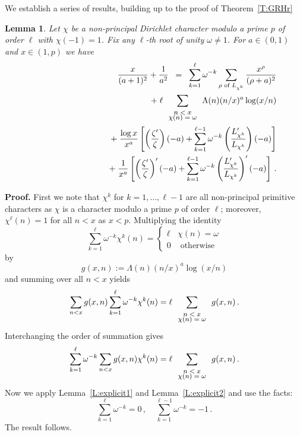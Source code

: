 \documentclass{amsart}
\newtheorem{lemma}[theorem]{Lemma}
\numberwithin{equation}{section}
\numberwithin{table}{section}
\begin{document}
We establish a series of results, building up to the proof
of Theorem~\ref{T:GRHr}
\begin{lemma}\label{L:rlemma1}
Let $\chi$ be a non-principal Dirichlet character modulo a prime $p$ of order $\ell$ with $\chi(-1)=1$.
Fix any $\ell$-th root of unity $\omega\neq 1$.
For $a\in(0,1)$ and $x\in(1,p)$ we have
\begin{eqnarray*}
  &&
\frac{x}{(a+1)^2}
+
\frac{1}{a^2}
 \;\;=\;\;
 \sum_{k=1}^\ell
 \omega^{-k}
 \sum_{\rho\text{ of $L_{\chi^k}$}}
 \frac{x^\rho}{(\rho+a)^2}
 \\ 
 &&\qquad\qquad\qquad\qquad
  \;+\;
 \ell
  
  \sum_{\footnotesize{\begin{array}{cc}n<x\\[-1ex]\chi(n)=\omega\end{array}}}
 \Lambda(n)
 (n/x)^a
 \log(x/n) 
\\
 &&\qquad\qquad\qquad\qquad
 \;+\;
 \frac{\log x}{x^a}
  \left[
  \left(\frac{\zeta'}{\zeta}\right)(-a)
  +
   \sum_{k=1}^{\ell-1}
 \omega^{-k}
 \left(\frac{L_{\chi^k}'}{L_{\chi^k}}\right)(-a)
 \right]
 \\
 &&\qquad\qquad\qquad\qquad
 \;+\;
 \frac{1}{x^a}
 \left[
  \left(\frac{\zeta'}{\zeta}\right)'(-a)
  +
   \sum_{k=1}^{\ell-1}
 \omega^{-k}
 \left(
 \frac{L_{\chi^k}'}{L_{\chi^k}}
 \right)'
 (-a)
 \right]
\,.
\end{eqnarray*}
\end{lemma}

\noindent\textbf{Proof.}
First we note that $\chi^k$ for $k=1,\dots,\ell-1$ are all non-principal primitive characters
as $\chi$ is a character modulo a prime $p$ of order $\ell$;
moreover, $\chi^\ell(n)=1$ for all $n<x$ as $x<p$.
Multiplying the identity
$$
  \sum_{k=1}^\ell
  \omega^{-k}\chi^k(n)
  =
  \begin{cases}
  \ell & \chi(n)=\omega\\
  0 & \text{ otherwise }
  \end{cases}
$$
by
$$
  g(x,n):=\Lambda(n)(n/x)^a\log(x/n)
$$
and summing over all $n<x$ yields
$$
  \sum_{n<x}
  g(x,n)
  \sum_{k=1}^\ell
  \omega^{-k}
  \chi^k(n)
  =
  \ell
  \sum_{\footnotesize{\begin{array}{cc}n<x\\[-1ex]\chi(n)=\omega\end{array}}}
  g(x,n)
  \,.
$$
Interchanging the order of summation gives
$$
  \sum_{k=1}^\ell
  \omega^{-k}
  \sum_{n<x}
  g(x,n)\chi^k(n)
  =
  \ell
  \sum_{\footnotesize{\begin{array}{cc}n<x\\[-1ex]\chi(n)=\omega\end{array}}}
  g(x,n)
  \,.
$$
Now we apply Lemma~\ref{L:explicit1} and Lemma~\ref{L:explicit2} and use the facts:
\begin{equation}\label{E:thefacts}
  \sum_{k=1}^\ell
  \omega^{-k}
  =0
  \,,
  \quad
  \sum_{k=1}^{\ell-1}
  \omega^{-k}
  =-1
  \,.
\end{equation}
The result follows.
{\raisebox{-.25ex}{\scalebox{.786}[1.272]{$\blacksquare$}}}
\end{document}
